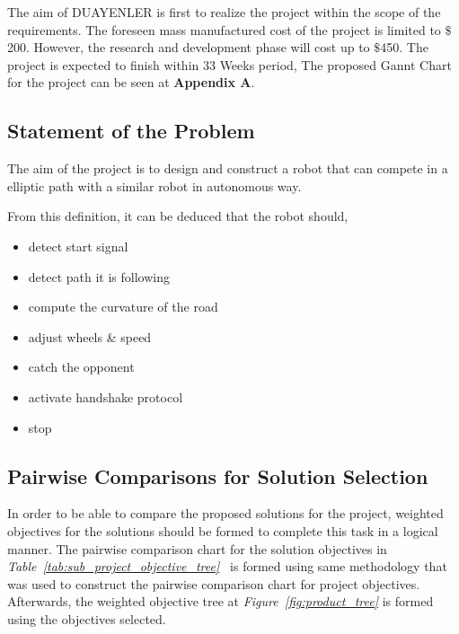 \documentclass[a4paper,12pt]{article}
\begin{document}
	The aim of DUAYENLER is first to realize the project within the scope of the requirements. The foreseen mass manufactured cost of the project is limited to $\$$200. However, the research and development phase will cost up to 	$\$$450. The project is expected to finish within 33 Weeks period, The proposed Gannt Chart for the project can be seen at \textbf{Appendix A}.
	
	\subsection{Statement of the Problem}
		
			The aim of the project is to design and construct a robot that can compete in a elliptic path with a similar robot in autonomous way.
			
			From this definition, it can be deduced that the robot should,
			\begin{itemize}
				\item detect start signal\vspace{-.2cm}
				\item detect path it is following\vspace{-.2cm}
				\item compute the curvature of the road\vspace{-.2cm}
				\item adjust wheels \& speed\vspace{-.2cm}
				\item catch the opponent\vspace{-.2cm}
				\item activate handshake protocol\vspace{-.2cm}
				\item stop\vspace{-.2cm}
			\end{itemize}
	
	
	\subsection{Pairwise Comparisons for Solution Selection}	
	
		In order to be able to compare the proposed solutions for the project, weighted objectives for the solutions should be formed to complete this task in a logical manner. The pairwise comparison chart for the solution objectives in \textit{Table~\ref{tab:sub_project_objective_tree}\ } is formed using same methodology that was used to construct the pairwise comparison chart for project objectives. Afterwards, the weighted objective tree at \textit{Figure~\ref{fig:product_tree}} is formed using the objectives selected.
	
\end{document}
